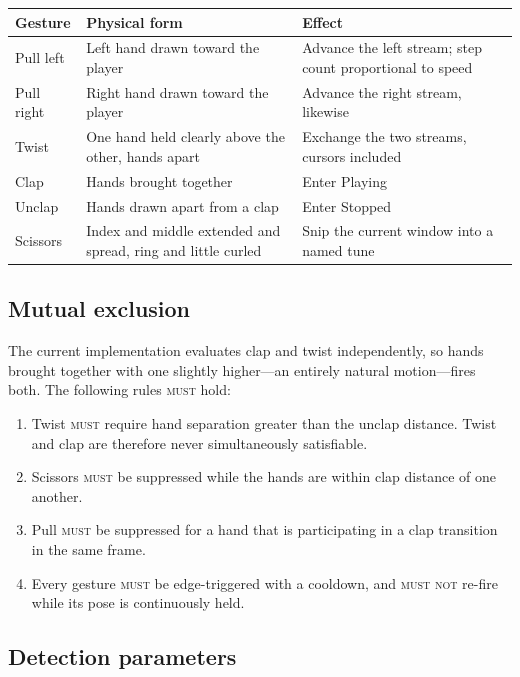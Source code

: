 \documentclass[11pt,a4paper]{article}
\newcommand{\MUST}{\textsc{must}}
\newcommand{\MUSTNOT}{\textsc{must not}}
\theoremstyle{definition}
\theoremstyle{plain}
\theoremstyle{remark}
\begin{document}
\begin{center}
\begin{tabular}{p{2.3cm} p{5.2cm} p{6.4cm}}
\toprule
\textbf{Gesture} & \textbf{Physical form} & \textbf{Effect} \\
\midrule
Pull left  & Left hand drawn toward the player & Advance the left stream; step count proportional to speed \\
Pull right & Right hand drawn toward the player & Advance the right stream, likewise \\
Twist      & One hand held clearly above the other, hands apart & Exchange the two streams, cursors included \\
Clap       & Hands brought together & Enter \textsf{Playing} \\
Unclap     & Hands drawn apart from a clap & Enter \textsf{Stopped} \\
Scissors   & Index and middle extended and spread, ring and little curled & Snip the current window into a named tune \\
\bottomrule
\end{tabular}
\end{center}

\subsection{Mutual exclusion}

The current implementation evaluates clap and twist independently, so hands brought together with
one slightly higher---an entirely natural motion---fires both. The following rules \MUST{} hold:

\begin{enumerate}[leftmargin=*]
\item Twist \MUST{} require hand separation greater than the unclap distance. Twist and clap are
      therefore never simultaneously satisfiable.
\item Scissors \MUST{} be suppressed while the hands are within clap distance of one another.
\item Pull \MUST{} be suppressed for a hand that is participating in a clap transition in the same
      frame.
\item Every gesture \MUST{} be edge-triggered with a cooldown, and \MUSTNOT{} re-fire while its
      pose is continuously held.
\end{enumerate}

\subsection{Detection parameters}
\end{document}
